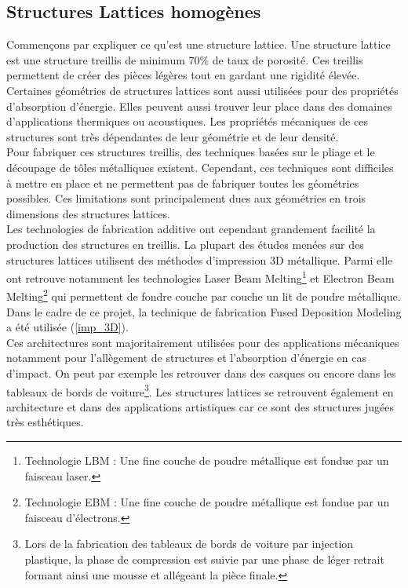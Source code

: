 \documentclass[a4paper]{article}
\begin{document}
	\subsection{Structures Lattices homogènes}
	\hspace{0.5cm}Commençons par expliquer ce qu’est une structure lattice. Une structure lattice est une structure treillis de minimum 70\% de taux de porosité. Ces treillis permettent de créer des pièces légères tout en gardant une rigidité élevée. Certaines géométries de structures lattices sont aussi utilisées pour des propriétés d’absorption d’énergie. Elles peuvent aussi trouver leur place dans des domaines d’applications thermiques ou acoustiques. Les propriétés mécaniques de ces structures sont très dépendantes de leur géométrie et de leur densité.\\
	
	Pour fabriquer ces structures treillis, des techniques basées sur le pliage et le découpage de tôles métalliques existent. Cependant, ces techniques sont difficiles à mettre en place et ne
	permettent pas de fabriquer toutes les géométries possibles. Ces limitations sont principalement dues aux géométries en trois dimensions des structures lattices.\\
	
	Les technologies de fabrication additive ont cependant grandement facilité la production des structures en treillis. La plupart des études menées sur des structures lattices utilisent des méthodes d'impression 3D métallique. Parmi elle ont retrouve notamment les technologies Laser Beam Melting\footnote{Technologie LBM : Une fine couche de poudre métallique est fondue par un faisceau laser.} et Electron Beam Melting\footnote{Technologie EBM : Une fine couche de poudre métallique est fondue par un faisceau d'électrons.} qui permettent de fondre couche par couche un lit de poudre métallique. Dans le cadre de ce projet, la technique de fabrication Fused Deposition Modeling a été utilisée (\ref{imp_3D}).\\
	
	Ces architectures sont majoritairement utilisées pour des applications mécaniques notamment pour l'allègement de structures et l'absorption d'énergie en cas d'impact. On peut par exemple les retrouver dans des casques ou encore dans les tableaux de bords de voiture\footnote{Lors de la fabrication des tableaux de bords de voiture par injection plastique, la phase de compression est suivie par une phase de léger retrait formant ainsi une mousse et allégeant la pièce finale.}. Les structures lattices se retrouvent également en architecture et dans des applications artistiques car ce sont des structures jugées très esthétiques.
	
\end{document}
